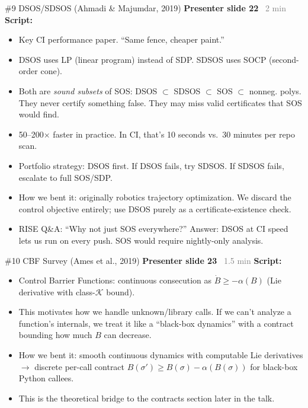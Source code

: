 \documentclass[aspectratio=169]{beamer}
\newcommand{\syncline}[2]{\textbf{#1} \hfill \textcolor{gray}{#2}}
\begin{document}
\begin{frame}{\#9 DSOS/SDSOS (Ahmadi \& Majumdar, 2019)}
\syncline{Presenter slide 22}{~2 min}
\textbf{Script:}
\begin{itemize}
  \item Key CI performance paper. ``Same fence, cheaper paint.''
  \item DSOS uses LP (linear program) instead of SDP. SDSOS uses SOCP (second-order cone).
  \item Both are \emph{sound subsets} of SOS: DSOS $\subset$ SDSOS $\subset$ SOS $\subset$ nonneg. polys. They never certify something false. They may miss valid certificates that SOS would find.
  \item 50--200$\times$ faster in practice. In CI, that's 10 seconds vs.\ 30 minutes per repo scan.
  \item Portfolio strategy: DSOS first. If DSOS fails, try SDSOS. If SDSOS fails, escalate to full SOS/SDP.
  \item How we bent it: originally robotics trajectory optimization. We discard the control objective entirely; use DSOS purely as a certificate-existence check.
  \item RISE Q\&A: ``Why not just SOS everywhere?'' Answer: DSOS at CI speed lets us run on every push. SOS would require nightly-only analysis.
\end{itemize}
\end{frame}

\begin{frame}{\#10 CBF Survey (Ames et al., 2019)}
\syncline{Presenter slide 23}{~1.5 min}
\textbf{Script:}
\begin{itemize}
  \item Control Barrier Functions: continuous consecution as $\dot{B} \ge -\alpha(B)$ (Lie derivative with class-$\mathcal{K}$ bound).
  \item This motivates how we handle unknown/library calls. If we can't analyze a function's internals, we treat it like a ``black-box dynamics'' with a contract bounding how much $B$ can decrease.
  \item How we bent it: smooth continuous dynamics with computable Lie derivatives $\to$ discrete per-call contract $B(\sigma') \ge B(\sigma) - \alpha(B(\sigma))$ for black-box Python callees.
  \item This is the theoretical bridge to the contracts section later in the talk.
\end{itemize}
\end{frame}
\end{document}
